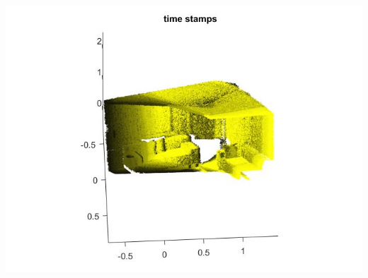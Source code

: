 \documentclass[fleqn]{article}
\begin{document}
\begin{adjustwidth}{4em}{0pt}
	\includegraphics[width = 1.5\textwidth,center]{slam_hw3_q3_partd_timeStamps.jpg}\\ \\
	
\end{adjustwidth}
\end{document}
